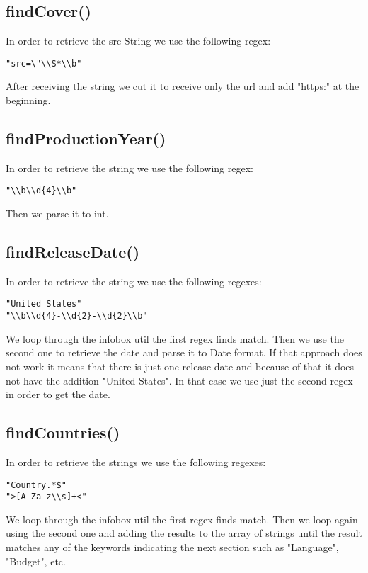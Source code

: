 \documentclass[a4paper,12pt]{article}
\begin{document}
\subsection{findCover()}
In order to retrieve the src String we use the following regex:
\begin{lstlisting}
"src=\"\\S*\\b"
\end{lstlisting}
After receiving the string we cut it to receive only the url and add "https:" at the beginning.

\subsection{findProductionYear()}
In order to retrieve the string we use the following regex:
\begin{lstlisting}
"\\b\\d{4}\\b"
\end{lstlisting}
Then we parse it to int.

\subsection{findReleaseDate()}
In order to retrieve the string we use the following regexes:
\begin{lstlisting}
"United States"
"\\b\\d{4}-\\d{2}-\\d{2}\\b"
\end{lstlisting}
We loop through the infobox util the first regex finds match. Then we use the second one to retrieve the date and parse it to Date format. If that approach does not work it means that there is just one release date and because of that it does not have the addition "United States". In that case we use just the second regex in order to get the date.

\subsection{findCountries()}
In order to retrieve the strings we use the following regexes:
\begin{lstlisting}
"Country.*$"
">[A-Za-z\\s]+<"
\end{lstlisting}
We loop through the infobox util the first regex finds match. Then we loop again using the second one and adding the results to the array of strings until the result matches any of the keywords indicating the next section such as "Language", "Budget", etc.
\end{document}
